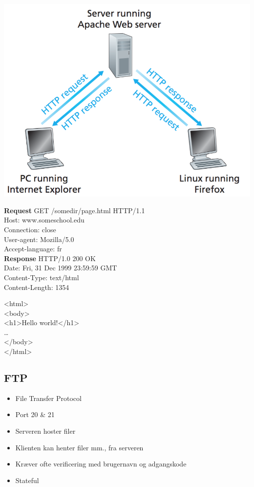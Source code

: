 {\includegraphics[scale=0.5]{2-application-layer/http-client-server.png}

\textbf{Request}
GET /somedir/page.html HTTP/1.1 \\
Host: www.someschool.edu \\
Connection: close \\
User-agent: Mozilla/5.0 \\
Accept-language: fr \\

\textbf{Response}
HTTP/1.0 200 OK \\
Date: Fri, 31 Dec 1999 23:59:59 GMT \\
Content-Type: text/html \\
Content-Length: 1354

\textless html\textgreater \\
\textless body\textgreater \\
\textless h1\textgreater Hello world!\textless /h1\textgreater \\
… \\
\textless /body\textgreater \\
\textless /html\textgreater \\

\subsection{FTP}
\begin{itemize}
	\item File Transfer Protocol
	\item Port 20 \& 21
	\item Serveren hoster filer
	\item Klienten kan henter filer mm., fra serveren
	\item Kræver ofte verificering med brugernavn og adgangskode
	\item Stateful
\end{itemize}

}
